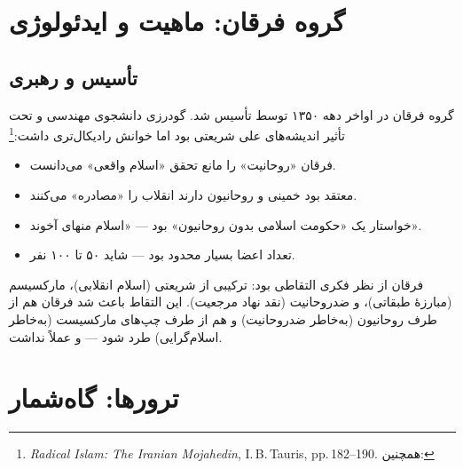 \section{گروه فرقان: ماهیت و ایدئولوژی}

\subsection{تأسیس و رهبری}

گروه فرقان در اواخر دهه ۱۳۵۰ توسط  تأسیس شد. گودرزی دانشجوی مهندسی و تحت تأثیر اندیشه‌های علی شریعتی بود اما خوانش رادیکال‌تری داشت:\footnote{ \textit{Radical Islam: The Iranian Mojahedin}, I.\,B.\,Tauris, pp.\,182--190. همچنین: }

\begin{itemize}[label=\textcolor{cAccent}{$\blacktriangleright$}, rightmargin=2em]
    \item فرقان «روحانیت» را مانع تحقق «اسلام واقعی» می‌دانست.
    \item معتقد بود خمینی و روحانیون دارند انقلاب را «مصادره» می‌کنند.
    \item خواستار یک «حکومت اسلامی بدون روحانیون» بود — «اسلام منهای آخوند».
    \item تعداد اعضا بسیار محدود بود — شاید ۵۰ تا ۱۰۰ نفر.
\end{itemize}

\begin{noteBox}
فرقان از نظر فکری التقاطی بود: ترکیبی از شریعتی (اسلام انقلابی)، مارکسیسم (مبارزهٔ طبقاتی)، و ضدروحانیت (نقد نهاد مرجعیت). این التقاط باعث شد فرقان هم از طرف روحانیون (به‌خاطر ضدروحانیت) و هم از طرف چپ‌های مارکسیست (به‌خاطر اسلام‌گرایی) طرد شود — و عملاً  نداشت.
\end{noteBox}

\section{ترورها: گاه‌شمار}

